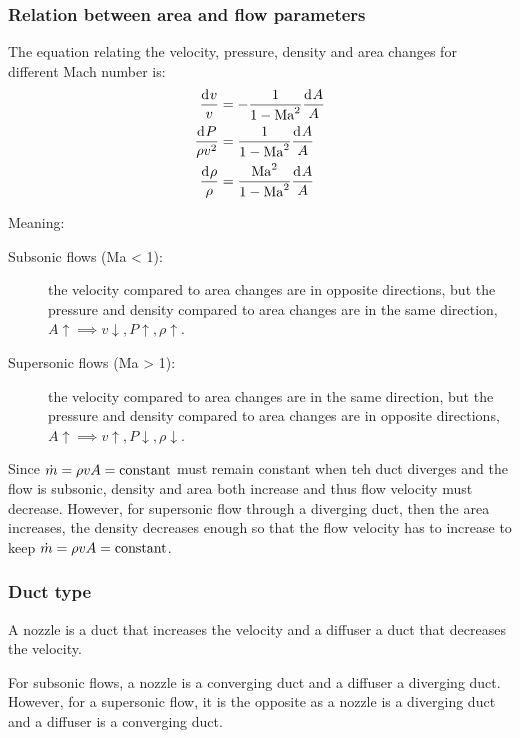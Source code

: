 \documentclass[10pt, twocolumn]{article}
\begin{document}
\subsubsection{Relation between area and flow parameters}
The equation relating the velocity, pressure, density and area changes for different Mach number is:
\begin{align*}
  \frac{\mathrm{d}^{} v}{v}        & = - \frac{1}{1 - \mathrm{Ma}^2}\frac{\mathrm{d}^{} A}{A}           \\
  \frac{\mathrm{d}^{} P}{\rho v^2} & = \frac{1}{1 - \mathrm{Ma}^2}\frac{\mathrm{d}^{} A}{A}             \\
  \frac{\mathrm{d}^{} \rho}{\rho}  & = \frac{\mathrm{Ma}^2}{1 - \mathrm{Ma}^2}\frac{\mathrm{d}^{} A}{A} \\
\end{align*}

Meaning:
\begin{description}
  \item[Subsonic flows (Ma < 1):] the velocity compared to area changes are in opposite directions, but the pressure and density compared to area changes are in the same direction, \(A\uparrow \implies v\downarrow, P\uparrow, \rho \uparrow\).
  \item[Supersonic flows (Ma > 1):] the velocity compared to area changes are in the same direction, but the pressure and density compared to area changes are in opposite directions, \(A\uparrow \implies v\uparrow, P\downarrow, \rho \downarrow\).
\end{description}

Since \(\dot{m} = \rho v A = \mathrm{constant}\) must remain constant when teh duct diverges and the flow is subsonic, density and area both increase and thus flow velocity must decrease. \newline
However, for supersonic flow through a diverging duct, then the area increases, the density decreases enough so that the flow velocity has to increase to keep \(\dot{m} = \rho v A = \mathrm{constant}\).


\subsubsection{Duct type}
A nozzle is a duct that increases the velocity and a diffuser a duct that decreases the velocity.

For subsonic flows, a nozzle is a converging duct and a diffuser a diverging duct.
However, for a supersonic flow, it is the opposite as a nozzle is a diverging duct and a diffuser is a converging duct.
\end{document}
